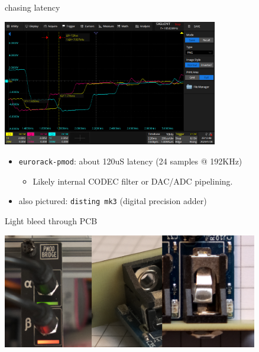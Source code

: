 \documentclass{beamer}
\begin{document}
\begin{frame}{chasing latency}


    \begin{center}
        \includegraphics[height=5.5cm]{img/latency_scope1.png}
    \end{center}

    \begin{itemize}
        \item \texttt{eurorack-pmod}: about 120uS latency (24 samples @ 192KHz)
        \begin{itemize}
            \item Likely internal CODEC filter or DAC/ADC pipelining.
        \end{itemize}
        \item also pictured: \texttt{disting mk3} (digital precision adder)
    \end{itemize}

\end{frame}

\begin{frame}{Light bleed through PCB}


    \begin{center}
        \includegraphics[height=5cm]{img/led_guide.png}
    \end{center}

\end{frame}
\end{document}
